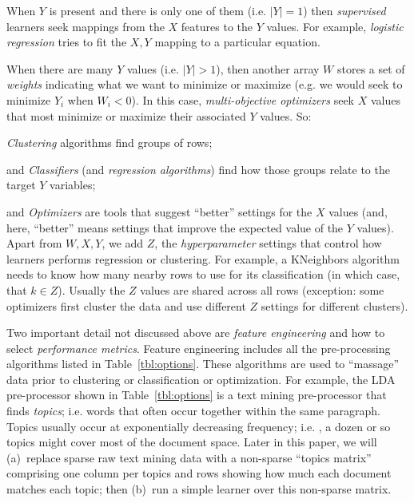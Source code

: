 \documentclass[twocolumn,landscape]{book}
\begin{document}
When $Y$ is present and there is only one of them (i.e. $|Y|=1$) then {\em supervised} learners seek mappings from the $X$ features to the $Y$ values. For example,
{\em logistic regression} tries to fit the $X,Y$ mapping to a particular equation. 

When there are many $Y$ values (i.e. $|Y|>1$), then another array $W$ stores a  set of
{\em weights} indicating what we want to  minimize or maximize  (e.g. we
would seek to minimize $Y_i$ when \mbox{$W_i<0$}).  In this case,
{\em multi-objective optimizers} seek $X$ values that most minimize or maximize their associated $Y$ values. So:
\bi
\item
{\em Clustering} algorithms find groups of rows;
\item
and {\em Classifiers}
(and {\em regression algorithms}) find how those groups relate to the target $Y$ variables;
\item
\BLUE
and {\em Optimizers}
are tools that suggest ``better'' settings
for the  $X$ values (and, here, ``better'' means settings that improve the expected value
of the  $Y$ values).\BLACK
\ei
Apart from $W,X,Y$,  we add $Z$, the {\em hyperparameter} settings that control how learners performs regression or clustering.
For example, a KNeighbors algorithm needs
to know how many nearby rows to use for its classification (in which case, that $k\in Z$).
Usually the $Z$ values are shared across all rows (exception: some optimizers first cluster the data and use different $Z$
settings for different clusters).

Two important detail not discussed above are  {\em feature engineering}
and  how to select {\em performance metrics}.
Feature engineering includes all the pre-processing algorithms listed in
Table~\ref{tbl:options}. These algorithms
are used to ``massage'' data prior to clustering or classification or optimization.
For example,   the LDA pre-processor shown in Table~\ref{tbl:options} is a text mining pre-processor that finds {\em topics}; i.e. words that often occur together within the same paragraph. Topics usually occur at  exponentially decreasing frequency; i.e. , a dozen or so topics might cover most of the document space. Later in this paper,
we will   (a)~replace sparse raw text mining data with a non-sparse ``topics matrix'' comprising one column per topics and rows showing how much each 
document matches each topic; then (b)~run a simple learner over this non-sparse matrix.
\end{document}
